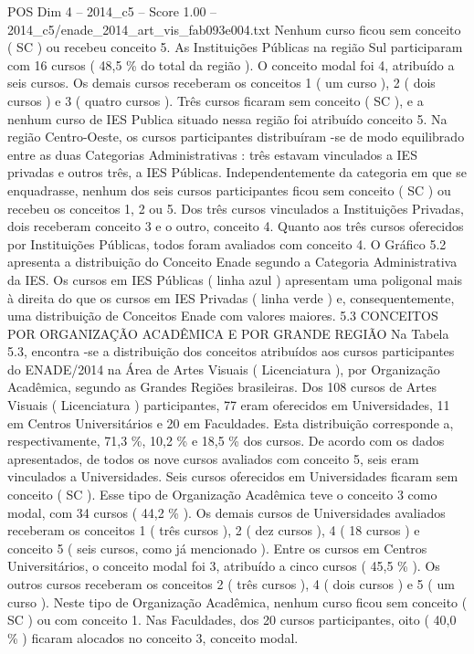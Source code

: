 \begin{textsample}{POS Dim 4 – 2014\_c5 – Score 1.00 – 2014\_c5/enade\_2014\_art\_vis\_fab093e004.txt}
Nenhum curso ficou sem conceito ( SC ) ou recebeu conceito 5.
As Instituições Públicas na região Sul participaram com 16 cursos ( 48,5 \% do total da região ).
O conceito modal foi 4, atribuído a seis cursos.
Os demais cursos receberam os conceitos 1 ( um curso ), 2 ( dois cursos ) e 3 ( quatro cursos ).
Três cursos ficaram sem conceito ( SC ), e a nenhum curso de IES Publica situado nessa região foi atribuído conceito 5.
Na região Centro-Oeste, os cursos participantes distribuíram -se de modo equilibrado entre as duas Categorias Administrativas : três estavam vinculados a IES privadas e outros três, a IES Públicas.
Independentemente da categoria em que se enquadrasse, nenhum dos seis cursos participantes ficou sem conceito ( SC ) ou recebeu os conceitos 1, 2 ou 5.
Dos três cursos vinculados a Instituições Privadas, dois receberam conceito 3 e o outro, conceito 4.
Quanto aos três cursos oferecidos por Instituições Públicas, todos foram avaliados com conceito 4.
O Gráfico 5.2 apresenta a distribuição do Conceito Enade segundo a Categoria Administrativa da IES.
Os cursos em IES Públicas ( linha azul ) apresentam uma poligonal mais à direita do que os cursos em IES Privadas ( linha verde ) e, consequentemente, uma distribuição de Conceitos Enade com valores maiores. 5.3 CONCEITOS POR ORGANIZAÇÃO ACADÊMICA E POR GRANDE REGIÃO Na Tabela 5.3, encontra -se a distribuição dos conceitos atribuídos aos cursos participantes do ENADE/2014 na Área de Artes Visuais ( Licenciatura ), por Organização Acadêmica, segundo as Grandes Regiões brasileiras.
Dos 108 cursos de Artes Visuais ( Licenciatura ) participantes, 77 eram oferecidos em Universidades, 11 em Centros Universitários e 20 em Faculdades.
Esta distribuição corresponde a, respectivamente, 71,3 \%, 10,2 \% e 18,5 \% dos cursos.
De acordo com os dados apresentados, de todos os nove cursos avaliados com conceito 5, seis eram vinculados a Universidades.
Seis cursos oferecidos em Universidades ficaram sem conceito ( SC ).
Esse tipo de Organização Acadêmica teve o conceito 3 como modal, com 34 cursos ( 44,2 \% ).
Os demais cursos de Universidades avaliados receberam os conceitos 1 ( três cursos ), 2 ( dez cursos ), 4 ( 18 cursos ) e conceito 5 ( seis cursos, como já mencionado ).
Entre os cursos em Centros Universitários, o conceito modal foi 3, atribuído a cinco cursos ( 45,5 \% ).
Os outros cursos receberam os conceitos 2 ( três cursos ), 4 ( dois cursos ) e 5 ( um curso ).
Neste tipo de Organização Acadêmica, nenhum curso ficou sem conceito ( SC ) ou com conceito 1.
Nas Faculdades, dos 20 cursos participantes, oito ( 40,0 \% ) ficaram alocados no conceito 3, conceito modal.

\end{textsample}
